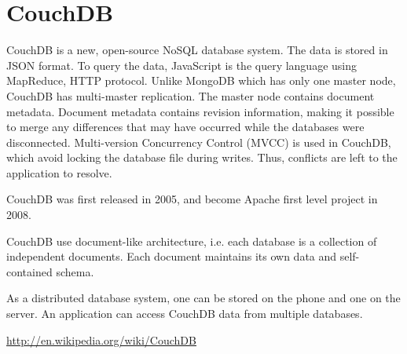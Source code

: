 \chapter{CouchDB}
\label{chap:CouchDB}

CouchDB is a new, open-source NoSQL database system. The data is stored in JSON
format. To query the data, JavaScript is the query language using MapReduce,
HTTP protocol. Unlike MongoDB which has only one master node, CouchDB has
multi-master replication.  The master node contains document metadata.
Document metadata contains revision information, making it possible to merge any
differences that may have occurred while the databases were disconnected.
Multi-version Concurrency Control (MVCC) is used in CouchDB, which avoid locking
the database file during writes. Thus, conflicts are left to the application to
resolve.

CouchDB was first released in 2005, and become Apache first level project in
2008.

CouchDB use document-like architecture, i.e. each database is a collection of
independent documents. Each document maintains its own data and self-contained
schema.


As a distributed database system, one can be stored on the phone and one on the
server. An application can access CouchDB data from multiple databases.

\url{http://en.wikipedia.org/wiki/CouchDB}